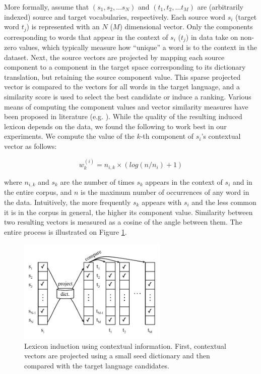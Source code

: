 \documentclass{article}
\begin{document}
More formally, assume that $(s_{1}, s_{2}, \dots s_{N})$ and $(t_{1}, t_{2}, \dots t_{M})$ are (arbitrarily indexed) source and target vocabularies, respectively.  Each source word $s_{i}$ (target word $t_{j}$) is represented with an $N$ ($M$) dimensional vector.  Only the components corresponding to words that appear in the context of $s_{i}$ ($t_{j}$) in data take on non-zero values, which typically measure how ``unique'' a word is to the context in the dataset.  Next, the source vectors are projected by mapping each source component to a component in the target space corresponding to its dictionary translation, but retaining the source component value.  This sparse projected vector is compared to the vectors for all words in the target language, and a similarity score is used to select the best candidate or induce a ranking.  Various means of computing the component values and vector similarity measures have been proposed in literature (e.g. \cite{Rapp:1999,Fung:1998}).  While the quality of the resulting induced lexicon depends on the data, we found the following to work best in our experiments.  We compute the value of the $k$-th component of $s_{i}$'s contextual vector  as follows: 

\begin{equation*}
w_{k}^{(i)} = n_{i,k} \times (log( {n / n_{i}}) + 1)
\end{equation*}

where $n_{i,k}$ and $s_{k}$ are the number of times $s_{k}$ appears in the context of $s_{i}$ and in the entire corpus, and $n$ is the maximum number of occurrences of any word in the data.  Intuitively, the more frequently $s_{k}$ appears with $s_{i}$ and the less common it is in the corpus in general, the higher its component value.  Similarity between two resulting vectors is measured as a cosine of the angle between them.  The entire process is illustrated on Figure \ref{fig:contextual}.\\

\begin{figure}
\centerline{\mbox{\includegraphics[width=2.8in]{figures/contextual}}}
\caption{Lexicon induction using contextual information. First, contextual vectors are projected using a small seed dictionary and then compared with the target language candidates.}
\label{fig:contextual}
\end{figure}
\end{document}
